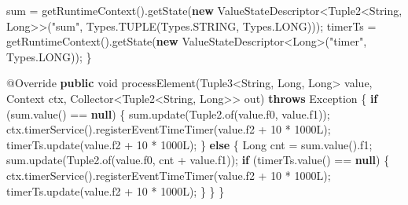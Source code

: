 \documentclass[cn,11pt,chinese]{elegantbook}
\newenvironment{Shaded}{}{}
\newcommand{\AttributeTok}[1]{\textcolor[rgb]{0.49,0.56,0.16}{#1}}
\newcommand{\BuiltInTok}[1]{#1}
\newcommand{\DataTypeTok}[1]{\textcolor[rgb]{0.56,0.13,0.00}{#1}}
\newcommand{\DecValTok}[1]{\textcolor[rgb]{0.25,0.63,0.44}{#1}}
\newcommand{\FunctionTok}[1]{\textcolor[rgb]{0.02,0.16,0.49}{#1}}
\newcommand{\KeywordTok}[1]{\textcolor[rgb]{0.00,0.44,0.13}{\textbf{#1}}}
\newcommand{\NormalTok}[1]{#1}
\newcommand{\StringTok}[1]{\textcolor[rgb]{0.25,0.44,0.63}{#1}}
\begin{document}
\begin{Shaded}
\begin{Highlighting}[]
\NormalTok{                    sum = }\FunctionTok{getRuntimeContext}\NormalTok{().}\FunctionTok{getState}\NormalTok{(}\KeywordTok{new}\NormalTok{ ValueStateDescriptor\textless{}Tuple2\textless{}}\BuiltInTok{String}\NormalTok{, }\BuiltInTok{Long}\NormalTok{\textgreater{}\textgreater{}(}\StringTok{"sum"}\NormalTok{, }\BuiltInTok{Types}\NormalTok{.}\FunctionTok{TUPLE}\NormalTok{(}\BuiltInTok{Types}\NormalTok{.}\FunctionTok{STRING}\NormalTok{, }\BuiltInTok{Types}\NormalTok{.}\FunctionTok{LONG}\NormalTok{)));}
\NormalTok{                    timerTs = }\FunctionTok{getRuntimeContext}\NormalTok{().}\FunctionTok{getState}\NormalTok{(}\KeywordTok{new}\NormalTok{ ValueStateDescriptor\textless{}}\BuiltInTok{Long}\NormalTok{\textgreater{}(}\StringTok{"timer"}\NormalTok{, }\BuiltInTok{Types}\NormalTok{.}\FunctionTok{LONG}\NormalTok{));}
\NormalTok{                \}}

                \AttributeTok{@Override}
                \KeywordTok{public} \DataTypeTok{void} \FunctionTok{processElement}\NormalTok{(Tuple3\textless{}}\BuiltInTok{String}\NormalTok{, }\BuiltInTok{Long}\NormalTok{, }\BuiltInTok{Long}\NormalTok{\textgreater{} value, }\BuiltInTok{Context}\NormalTok{ ctx, Collector\textless{}Tuple2\textless{}}\BuiltInTok{String}\NormalTok{, }\BuiltInTok{Long}\NormalTok{\textgreater{}\textgreater{} out) }\KeywordTok{throws} \BuiltInTok{Exception}\NormalTok{ \{}
                    \KeywordTok{if}\NormalTok{ (sum.}\FunctionTok{value}\NormalTok{() == }\KeywordTok{null}\NormalTok{) \{}
\NormalTok{                        sum.}\FunctionTok{update}\NormalTok{(Tuple2.}\FunctionTok{of}\NormalTok{(value.}\FunctionTok{f0}\NormalTok{, value.}\FunctionTok{f1}\NormalTok{));}
\NormalTok{                        ctx.}\FunctionTok{timerService}\NormalTok{().}\FunctionTok{registerEventTimeTimer}\NormalTok{(value.}\FunctionTok{f2}\NormalTok{ + }\DecValTok{10}\NormalTok{ * }\DecValTok{1000L}\NormalTok{);}
\NormalTok{                        timerTs.}\FunctionTok{update}\NormalTok{(value.}\FunctionTok{f2}\NormalTok{ + }\DecValTok{10}\NormalTok{ * }\DecValTok{1000L}\NormalTok{);}
\NormalTok{                    \} }\KeywordTok{else}\NormalTok{ \{}
                        \BuiltInTok{Long}\NormalTok{ cnt = sum.}\FunctionTok{value}\NormalTok{().}\FunctionTok{f1}\NormalTok{;}
\NormalTok{                        sum.}\FunctionTok{update}\NormalTok{(Tuple2.}\FunctionTok{of}\NormalTok{(value.}\FunctionTok{f0}\NormalTok{, cnt + value.}\FunctionTok{f1}\NormalTok{));}
                        \KeywordTok{if}\NormalTok{ (timerTs.}\FunctionTok{value}\NormalTok{() == }\KeywordTok{null}\NormalTok{) \{}
\NormalTok{                            ctx.}\FunctionTok{timerService}\NormalTok{().}\FunctionTok{registerEventTimeTimer}\NormalTok{(value.}\FunctionTok{f2}\NormalTok{ + }\DecValTok{10}\NormalTok{ * }\DecValTok{1000L}\NormalTok{);}
\NormalTok{                            timerTs.}\FunctionTok{update}\NormalTok{(value.}\FunctionTok{f2}\NormalTok{ + }\DecValTok{10}\NormalTok{ * }\DecValTok{1000L}\NormalTok{);}
\NormalTok{                        \}}
\NormalTok{                    \}}
\NormalTok{                \}}


\end{Highlighting}
\end{Shaded}
\end{document}
